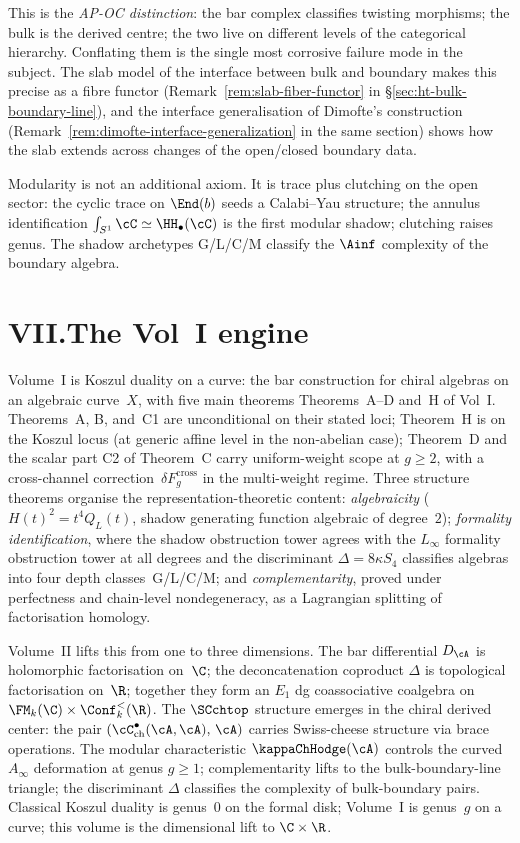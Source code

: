 This is the \emph{AP-OC distinction}: the bar complex classifies
twisting morphisms; the bulk is the derived centre; the two live
on different levels of the categorical hierarchy. Conflating
them is the single most corrosive failure mode in the subject.
The slab model of the interface between bulk and boundary makes
this precise as a fibre functor
(Remark~\ref{rem:slab-fiber-functor} in
\S\ref{sec:ht-bulk-boundary-line}), and the interface
generalisation of Dimofte's construction
(Remark~\ref{rem:dimofte-interface-generalization} in the same
section) shows how the slab extends across changes of the
open/closed boundary data.

Modularity is not an additional axiom. It is trace plus
clutching on the open sector: the cyclic trace on $\End(b)$
seeds a Calabi--Yau structure; the annulus identification
$\int_{S^1} \cC \simeq \HH_\bullet(\cC)$ is the first modular
shadow; clutching raises genus. The shadow archetypes
G/L/C/M classify the $\Ainf$ complexity of the boundary algebra.

\section*{VII.\quad The Vol~I engine}

Volume~I is Koszul duality on a curve: the bar construction for
chiral algebras on an algebraic curve~$X$, with five main
theorems Theorems~A--D and~H of Vol~I. Theorems~A, B, and~C1
are unconditional on their stated loci; Theorem~H is on the
Koszul locus \textup{(}at generic affine
level in the non-abelian case\textup{)}; Theorem~D and the
scalar part C2 of Theorem~C
carry uniform-weight scope at $g \ge 2$, with a cross-channel
correction~$\delta F_g^{\mathrm{cross}}$ in the multi-weight
regime. Three structure theorems organise the
representation-theoretic content: \emph{algebraicity}
($H(t)^2 = t^4 Q_L(t)$, shadow generating function algebraic of
degree~$2$); \emph{formality identification}, where the shadow
obstruction tower agrees with the $L_\infty$ formality
obstruction tower at all degrees and the discriminant
$\Delta = 8\kappa S_4$ classifies algebras into four depth
classes~G/L/C/M; and \emph{complementarity}, proved under
perfectness and chain-level nondegeneracy, as a Lagrangian
splitting of factorisation homology.

Volume~II lifts this from one to three dimensions. The bar
differential $D_\cA$ is holomorphic factorisation on~$\C$; the
deconcatenation coproduct $\Delta$ is topological factorisation
on~$\R$; together they form an $E_1$ dg coassociative coalgebra on
$\FM_k(\C) \times \Conf_k^<(\R)$. The $\SCchtop$ structure
emerges in the chiral derived center: the pair
$(\cC^\bullet_{\mathrm{ch}}(\cA,\cA),\,\cA)$ carries
Swiss-cheese structure via brace operations. The modular
characteristic $\kappaChHodge(\cA)$ controls the curved $A_\infty$
deformation at genus $g \ge 1$; complementarity lifts to the
bulk-boundary-line triangle; the discriminant $\Delta$
classifies the complexity of bulk-boundary pairs. Classical
Koszul duality is genus~$0$ on the formal disk; Volume~I is
genus~$g$ on a curve; this volume is the dimensional lift to
$\C \times \R$.

